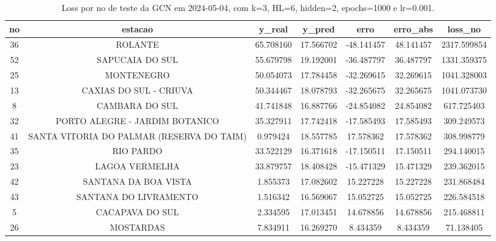 \begin{table}[h]
\centering
\caption{Loss por no de teste da GCN em 2024-05-04, com k=3, HL=6, hidden=2, epochs=1000 e lr=0.001.}
\label{tab:gcn_loss_k3_hl6_h2_e1000_d20240504}
\begin{tabular}{ccccccc}
\toprule
no & estacao & y\_real & y\_pred & erro & erro\_abs & loss\_no \\
\midrule
36 & ROLANTE & 65.708160 & 17.566702 & -48.141457 & 48.141457 & 2317.599854 \\
52 & SAPUCAIA DO SUL & 55.679798 & 19.192001 & -36.487797 & 36.487797 & 1331.359375 \\
25 & MONTENEGRO & 50.054073 & 17.784458 & -32.269615 & 32.269615 & 1041.328003 \\
13 & CAXIAS DO SUL - CRIUVA & 50.344467 & 18.078793 & -32.265675 & 32.265675 & 1041.073730 \\
8 & CAMBARA DO SUL & 41.741848 & 16.887766 & -24.854082 & 24.854082 & 617.725403 \\
32 & PORTO ALEGRE - JARDIM BOTANICO & 35.327911 & 17.742418 & -17.585493 & 17.585493 & 309.249573 \\
41 & SANTA VITORIA DO PALMAR (RESERVA DO TAIM) & 0.979424 & 18.557785 & 17.578362 & 17.578362 & 308.998779 \\
35 & RIO PARDO & 33.522129 & 16.371618 & -17.150511 & 17.150511 & 294.140015 \\
23 & LAGOA VERMELHA & 33.879757 & 18.408428 & -15.471329 & 15.471329 & 239.362015 \\
42 & SANTANA DA BOA VISTA & 1.855373 & 17.082602 & 15.227228 & 15.227228 & 231.868484 \\
43 & SANTANA DO LIVRAMENTO & 1.516342 & 16.569067 & 15.052725 & 15.052725 & 226.584518 \\
5 & CACAPAVA DO SUL & 2.334595 & 17.013451 & 14.678856 & 14.678856 & 215.468811 \\
26 & MOSTARDAS & 7.834911 & 16.269270 & 8.434359 & 8.434359 & 71.138405 \\
\bottomrule
\end{tabular}
\end{table}
